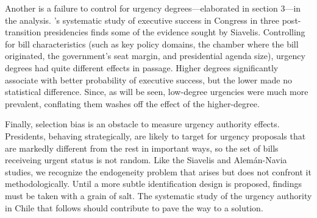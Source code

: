 \documentclass[letter,12pt]{article}
\begin{document}
Another is a failure to control for urgency degrees---elaborated in section 3---in the analysis. \citeauthor{aleman.navia.UrgChi.2009}'s \citeyearpar{aleman.navia.UrgChi.2009} systematic study of executive success in Congress in three post-transition presidencies finds some of the evidence sought by Siavelis. Controlling for bill characteristics (such as key policy domains, the chamber where the bill originated, the government's seat margin, and presidential agenda size), urgency degrees had quite different effects in passage. Higher degrees significantly associate with better probability of executive success, but the lower made no statistical difference. Since, as will be seen, low-degree urgencies were much more prevalent, conflating them washes off the effect of the higher-degree. 


Finally, selection bias is an obstacle to measure urgency authority effects. Presidents, behaving strategically, are likely to target for urgency proposals that are markedly different from the rest in important ways, so the set of bills receiveing urgent status is not random. Like the Siavelis and Alem\'an-Navia studies, we recognize the endogeneity problem that arises but does not confront it methodologically. Until a more subtle identification design is proposed, findings must be taken with a grain of salt. The systematic study of the urgency authority in Chile that follows should contribute to pave the way to a solution. 
\end{document}
